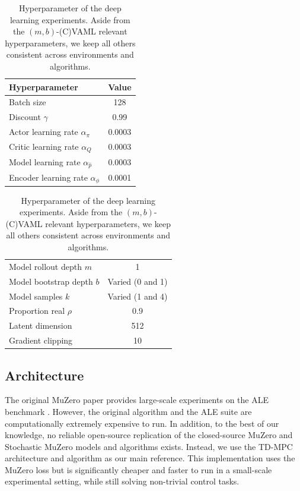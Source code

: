 \begin{table}[t]
    \centering
    \begin{tabular}{l|c}
    Hyperparameter & Value \\\hline
    Batch size & 128\\
    Discount $\gamma$ & 0.99 \\
    Actor learning rate $\alpha_\pi$  & 0.0003 \\
    Critic learning rate $\alpha_Q$ & 0.0003 \\
    Model learning rate $\alpha_{\hat{p}}$  & 0.0003 \\
    Encoder learning rate $\alpha_\phi$ & 0.0001 \\
    \end{tabular}
    \begin{tabular}{l|c}
     \\
    Model rollout depth $m$ & 1 \\
    Model bootstrap depth $b$ & Varied (0 and 1) \\
    Model samples $k$ & Varied (1 and 4) \\
    Proportion real $\rho$ & 0.9 \\
    Latent dimension & 512 \\
    Gradient clipping & 10 \\
    \end{tabular}
    \caption{Hyperparameter of the deep learning experiments. Aside from the $(m,b)$-(C)VAML relevant hyperparameters, we keep all others consistent across environments and algorithms.}
    \label{tab:cvaml:hyperparams}
\end{table}

\subsection{Architecture}
The original MuZero paper \parencite{schrittwieser2020mastering} provides large-scale experiments on the ALE benchmark \parencite{bellemare13arcade}.
However, the original algorithm and the ALE suite are computationally extremely expensive to run.
In addition, to the best of our knowledge, no reliable open-source replication of the closed-source MuZero and Stochastic MuZero models and algorithms exists.
Instead, we use the TD-MPC architecture and algorithm \parencite{hansen2022temporal} as our main reference.
This implementation uses the MuZero loss but is significantly cheaper and faster to run in a small-scale experimental setting, while still solving non-trivial control tasks.

